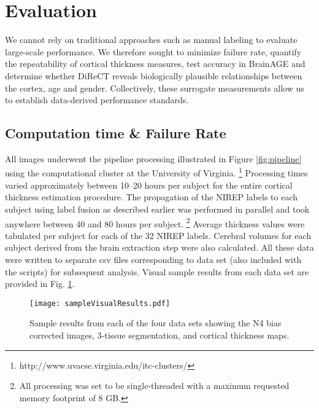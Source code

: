 \section{Evaluation}
We cannot rely on traditional approaches such as manual
labeling to evaluate large-scale performance.  We therefore sought to
minimize failure rate, quantify the repeatability of cortical
thickness measures, test accuracy in BrainAGE \cite{franke2010} and
determine whether DiReCT reveals biologically plausible relationships
between the cortex, age and gender.  Collectively, these surrogate
measurements allow us to establish data-derived performance standards.

\subsection{Computation time \& Failure Rate}
All images underwent the pipeline processing illustrated in Figure 
\ref{fig:pipeline} using the computational cluster at the University 
of Virginia.%
\footnote{
http://www.uvacse.virginia.edu/itc-clusters/
}  
Processing times varied approximately between 10--20 hours per subject
for the entire cortical thickness estimation procedure.  The propagation of the
NIREP labels to each subject using label fusion as described earlier
was performed in parallel and took anywhere between 40 and 80 hours per 
subject.%
\footnote{
All processing was set to be single-threaded with a maximum requested memory 
footprint of 8 GB.
}  
Average thickness values were tabulated per subject for each of the
32 NIREP labels.  Cerebral volumes for each subject derived from the brain 
extraction step were also calculated.  All these data were written to separate csv
files corresponding to data set (also included with the scripts) for subsequent 
analysis.  Visual sample results from each data set are provided in 
Fig. \ref{fig:sampleResults}.

\begin{figure}
  \begin{center}
  \texttt{[image: sampleVisualResults.pdf]}
  \caption{Sample results from each of the four data sets showing the N4 bias
  corrected images, 3-tissue segmentation, and cortical thickness maps.}
  \label{fig:sampleResults}
  \end{center}
\end{figure}

  
